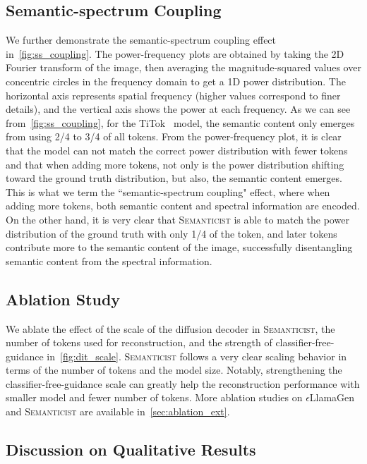 \documentclass[10pt,twocolumn,letterpaper]{article}
\DeclareRobustCommand{\modelname}{\textsc{Semanticist}\xspace}
\DeclareRobustCommand{\armodelname}{$\epsilon$LlamaGen\xspace}
\begin{document}
\subsection{Semantic-spectrum Coupling}
We further demonstrate the semantic-spectrum coupling effect in~\cref{fig:ss_coupling}.
The power-frequency plots are obtained by taking the 2D Fourier transform of the image, then averaging the magnitude-squared values over concentric circles in the frequency domain to get a 1D power distribution.
The horizontal axis represents spatial frequency (higher values correspond to finer details), and the vertical axis shows the power at each frequency.
As we can see from~\cref{fig:ss_coupling}, for the TiTok~\cite{titok} model, the semantic content only emerges from using 2/4 to 3/4 of all tokens.
From the power-frequency plot, it is clear that the model can not match the correct power distribution with fewer tokens and that when adding more tokens, not only is the power distribution shifting toward the ground truth distribution, but also, the semantic content emerges.
This is what we term the ``semantic-spectrum coupling" effect, where when adding more tokens, both semantic content and spectral information are encoded.
On the other hand, it is very clear that \modelname is able to match the power distribution of the ground truth with only 1/4 of the token, and later tokens contribute more to the semantic content of the image, successfully disentangling semantic content from the spectral information.

\subsection{Ablation Study}

We ablate the effect of the scale of the diffusion decoder in \modelname, the number of tokens used for reconstruction, and the strength of classifier-free-guidance in~\cref{fig:dit_scale}.
\modelname follows a very clear scaling behavior in terms of the number of tokens and the model size.
Notably, strengthening the classifier-free-guidance scale can greatly help the reconstruction performance with smaller model and fewer number of tokens.
More ablation studies on \armodelname and \modelname are available in~\cref{sec:ablation_ext}.






\subsection{Discussion on Qualitative Results}
\end{document}
